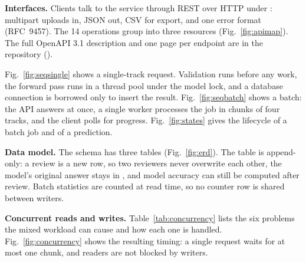 \textbf{Interfaces.} Clients talk to the service through REST over HTTP under : multipart
uploads in, JSON out, CSV for export, and one error format (RFC~9457). The 14 operations group into
three resources (Fig.~\ref{fig:apimap}). The full OpenAPI 3.1 description and one page per endpoint
are in the repository ().


Fig.~\ref{fig:seqsingle} shows a single-track request. Validation runs before any work, the forward
pass runs in a thread pool under the model lock, and a database connection is borrowed only to insert
the result. Fig.~\ref{fig:seqbatch} shows a batch: the API answers  at once, a
single worker processes the job in chunks of four tracks, and the client polls for progress.
Fig.~\ref{fig:states} gives the lifecycle of a batch job and of a prediction.




\textbf{Data model.} The schema has three tables (Fig.~\ref{fig:erd}). The  table is
append-only: a review is a new row, so two reviewers never overwrite each other, the model's original
answer stays in , and model accuracy can still be computed after review.
Batch statistics are counted at read time, so no counter row is shared between writers.


\textbf{Concurrent reads and writes.} Table~\ref{tab:concurrency} lists the six problems the mixed
workload can cause and how each one is handled. Fig.~\ref{fig:concurrency} shows the resulting timing:
a single request waits for at most one chunk, and readers are not blocked by writers.

